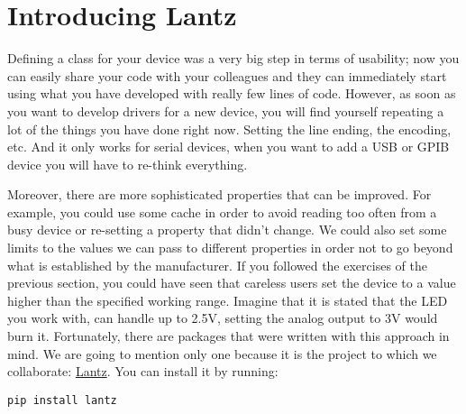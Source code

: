 
\section{Introducing Lantz}\label{introducinglantz}

Defining a class for your device was a very big step in terms of
usability; now you can easily share your code with your colleagues and
they can immediately start using what you have developed with really few
lines of code. However, as soon as you want to develop drivers for a new
device, you will find yourself repeating a lot of the things you have
done right now. Setting the line ending, the encoding, etc. And it only
works for serial devices, when you want to add a {USB} or {GPIB} device
you will have to re-think everything.

Moreover, there are more sophisticated properties that can be improved.
For example, you could use some cache in order to avoid reading too
often from a busy device or re-setting a property that didn't change. We
could also set some limits to the values we can pass to different
properties in order not to go beyond what is established by the
manufacturer. If you followed the exercises of the previous section, you
could have seen that careless users set the device to a value higher
than the specified working range. Imagine that it is stated that the
{LED} you work with, can handle up to 2.5V, setting the analog output to
3V would burn it. Fortunately, there are packages that were written with
this approach in mind. We are going to mention only one because it is
the project to which we collaborate:
\href{https://lantz.readthedocs.io/en/0.3/}{Lantz}. You can install it
by running:

\begin{verbatim}
pip install lantz
\end{verbatim}


